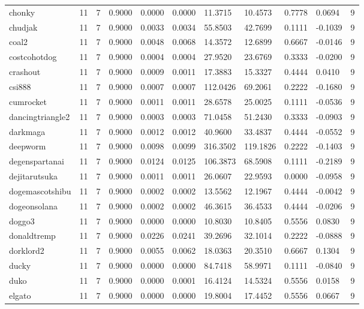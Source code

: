 \begin{table}[htbp]
\begin{tabular}{lllllllllll}
chonky & 11 & 7 & 0.9000 & 0.0000 & 0.0000 & 11.3715 & 10.4573 & 0.7778 & 0.0694 & 9 \\
chudjak & 11 & 7 & 0.9000 & 0.0033 & 0.0034 & 55.8503 & 42.7699 & 0.1111 & -0.1039 & 9 \\
coal2 & 11 & 7 & 0.9000 & 0.0048 & 0.0068 & 14.3572 & 12.6899 & 0.6667 & -0.0146 & 9 \\
costcohotdog & 11 & 7 & 0.9000 & 0.0004 & 0.0004 & 27.9520 & 23.6769 & 0.3333 & -0.0200 & 9 \\
crashout & 11 & 7 & 0.9000 & 0.0009 & 0.0011 & 17.3883 & 15.3327 & 0.4444 & 0.0410 & 9 \\
csi888 & 11 & 7 & 0.9000 & 0.0007 & 0.0007 & 112.0426 & 69.2061 & 0.2222 & -0.1680 & 9 \\
cumrocket & 11 & 7 & 0.9000 & 0.0011 & 0.0011 & 28.6578 & 25.0025 & 0.1111 & -0.0536 & 9 \\
dancingtriangle2 & 11 & 7 & 0.9000 & 0.0003 & 0.0003 & 71.0458 & 51.2430 & 0.3333 & -0.0903 & 9 \\
darkmaga & 11 & 7 & 0.9000 & 0.0012 & 0.0012 & 40.9600 & 33.4837 & 0.4444 & -0.0552 & 9 \\
deepworm & 11 & 7 & 0.9000 & 0.0098 & 0.0099 & 316.3502 & 119.1826 & 0.2222 & -0.1403 & 9 \\
degenspartanai & 11 & 7 & 0.9000 & 0.0124 & 0.0125 & 106.3873 & 68.5908 & 0.1111 & -0.2189 & 9 \\
dejitarutsuka & 11 & 7 & 0.9000 & 0.0011 & 0.0011 & 26.0607 & 22.9593 & 0.0000 & -0.0958 & 9 \\
dogemascotshibu & 11 & 7 & 0.9000 & 0.0002 & 0.0002 & 13.5562 & 12.1967 & 0.4444 & -0.0042 & 9 \\
dogeonsolana & 11 & 7 & 0.9000 & 0.0002 & 0.0002 & 46.3615 & 36.4533 & 0.4444 & -0.0206 & 9 \\
doggo3 & 11 & 7 & 0.9000 & 0.0000 & 0.0000 & 10.8030 & 10.8405 & 0.5556 & 0.0830 & 9 \\
donaldtremp & 11 & 7 & 0.9000 & 0.0226 & 0.0241 & 39.2696 & 32.1014 & 0.2222 & -0.0888 & 9 \\
dorklord2 & 11 & 7 & 0.9000 & 0.0055 & 0.0062 & 18.0363 & 20.3510 & 0.6667 & 0.1304 & 9 \\
ducky & 11 & 7 & 0.9000 & 0.0000 & 0.0000 & 84.7418 & 58.9971 & 0.1111 & -0.0840 & 9 \\
duko & 11 & 7 & 0.9000 & 0.0000 & 0.0001 & 16.4124 & 14.5324 & 0.5556 & 0.0158 & 9 \\
elgato & 11 & 7 & 0.9000 & 0.0000 & 0.0000 & 19.8004 & 17.4452 & 0.5556 & 0.0667 & 9 \\

\end{tabular}
\end{table}
